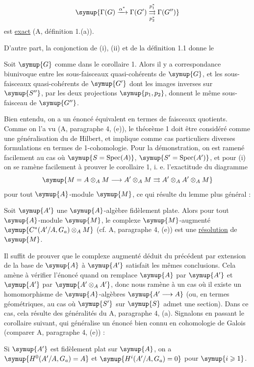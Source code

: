\[
  \symup{\Gamma(G)\xrightarrow{\alpha^*}\Gamma(G')
  \underset{p_2^*}{\overset{p_1^*}{\rightrightarrows}}\Gamma(G'')}
\]
est \uline{exact} (A, définition 1.(a)).

D'autre part, la conjonction de (i), (ii) et de la définition 1.1 donne le

 Soit $\symup{G}$ comme dans le corollaire 1. Alors il y a
correspondance biunivoque entre les sous-faisceaux quasi-cohérents de $\symup{G}$, et
les sous-faisceaux quasi-cohérents de $\symup{G'}$ dont les images inverses sur $\symup{S''}$,
par les deux projections $\symup{p_1,p_2}$, donnent le même sous-faisceau de $\symup{G''}$.

Bien entendu, on a un énoncé équivalent en termes de faisceaux quotients. Comme
on l'a vu (A, paragraphe 4, (e)), le théorème 1 doit être considéré comme une
généralisation du  de Hilbert, et implique comme cas particuliers
diverses formulations en termes de 1-cohomologie. Pour la démonstration, on est
ramené facilement au cas où $\symup{S=\operatorname{Spec}(A)}$,
$\symup{S'=\operatorname{Spec}(A')}$, et pour (i) on se ramène facilement à prouver le
corollaire 1, i. e. l'exactitude du diagramme
\[
  \symup{M=A\otimes_A M\longrightarrow A'\otimes_A M
  \rightrightarrows A'\otimes_AA'\otimes_A M}
\]
pour tout $\symup{A}$-module $\symup{M}$, ce qui résulte du lemme plus général :

 Soit $\symup{A'}$ une $\symup{A}$-algèbre fidèlement plate. Alors pour
tout $\symup{A}$-module $\symup{M}$, le complexe $\symup{M}$-augmenté
$\symup{C^*(A'/A,G_a)\otimes_A M}$ (cf. A, paragraphe 4, (e)) est une
\uline{résolution} de $\symup{M}$.

Il suffit de prouver que le complexe augmenté déduit du précédent par
extension de la base de $\symup{A}$ à $\symup{A'}$ satisfait les mêmes conclusions. Cela amène
à vérifier l'énoncé quand on remplace $\symup{A}$ par $\symup{A'}$ et $\symup{A'}$ par
$\symup{A'\otimes_AA'}$, donc nous ramène à un cas où il existe un homomorphisme de
$\symup{A}$-algèbres $\symup{A'\longrightarrow A}$ (ou, en termes géométriques, au cas où $\symup{S'}$
sur $\symup{S}$ admet une section). Dans ce cas, cela résulte des généralités du A,
paragraphe 4, (a). Signalons en passant le corollaire suivant, qui généralise
un énoncé bien connu en cohomologie de Galois (comparer A, paragraphe 4, (e)) :

 Si $\symup{A'}$ est fidèlement plat sur $\symup{A}$, on a
$\symup{H^0(A'/A,G_a)=A}$ et
$\symup{H^i(A'/A,G_a)=0}$ pour $\symup{i\geqslant1}$.


